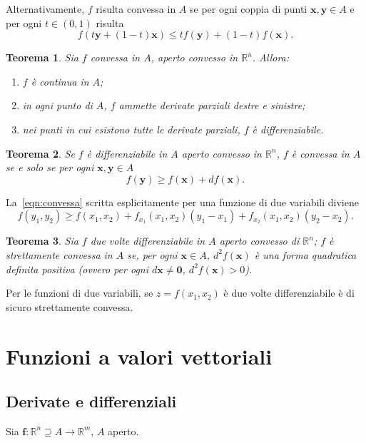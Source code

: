 \documentclass[a4paper]{book}
\numberwithin{equation}{section}
\theoremstyle{plain}
\newtheorem{teor}{Teorema}[section]
\theoremstyle{definition}
\theoremstyle{remark}
\renewcommand{\vec}{\boldsymbol}
\theoremstyle{example}
\begin{document}
Alternativamente, $f$ risulta convessa in $A$ se per ogni coppia di punti $\vec{x}, \vec{y} \in A$ e per ogni $t \in (0,1)$ risulta
\begin{equation}
	f(t\vec{y} + (1-t)\vec{x}) \le tf(\vec{y}) + (1-t)f(\vec{x}).
\end{equation}

\begin{teor}
	Sia $f$ convessa in $A$, aperto convesso in $\mathbb{R}^n$. Allora:
	\begin{enumerate}
		\item $f$ è continua in $A$;
		\item in ogni punto di $A$, $f$ ammette derivate parziali destre e sinistre;
		\item nei punti in cui esistono tutte le derivate parziali, $f$ è differenziabile.
	\end{enumerate}
\end{teor}

\begin{teor}
	Se $f$ è differenziabile in $A$ aperto convesso in $\mathbb{R}^n$, $f$ è convessa in $A$ se e solo se per ogni $\vec{x}, \vec{y} \in A$
	\begin{equation}
		\label{eqn:convessa}
		f(\vec{y}) \ge f(\vec{x})+df(\vec{x}).
	\end{equation}
\end{teor}

La~\eqref{eqn:convessa} scritta esplicitamente per una funzione di due variabili diviene
\begin{equation*}
	f(y_1, y_2) \ge f(x_1, x_2) + f_{x_1}(x_1, x_2)(y_1 - x_1) + f_{x_2}(x_1, x_2)(y_2 - x_2).
\end{equation*}

\begin{teor}
	Sia $f$ due volte differenziabile in $A$ aperto convesso di $\mathbb{R}^n$; $f$ è strettamente convessa in $A$ se, per ogni $\vec{x} \in A$, $d^2f(\vec{x})$ è una forma quadratica definita positiva (ovvero per ogni $d\vec{x} \ne \vec{0}$, $d^2f(\vec{x}) > 0$).
\end{teor}

Per le funzioni di due variabili, se $z = f(x_1, x_2)$ è due volte differenziabile è di sicuro strettamente convessa.

\section{Funzioni a valori vettoriali}

\subsection{Derivate e differenziali}
Sia $\vec{f} \colon \mathbb{R}^n \supseteq A \to \mathbb{R}^m$, $A$ aperto.
\end{document}
